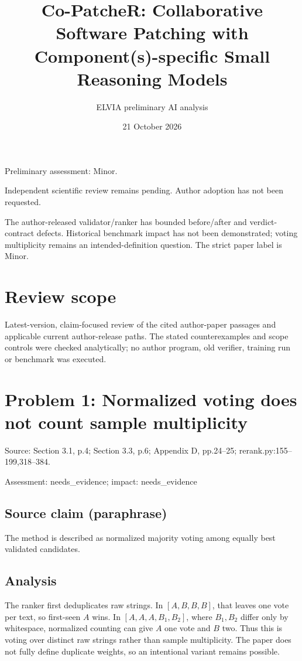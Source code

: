 \documentclass[11pt]{article}
\begin{document}
\title{Co-PatcheR: Collaborative Software Patching with Component(s)-specific Small Reasoning Models}

\author{ELVIA preliminary AI analysis}\date{21 October 2026}\maketitle

Preliminary assessment: Minor.\par

Independent scientific review remains pending. Author adoption has not been requested.

The author-released validator/ranker has bounded before/after and verdict-contract defects. Historical benchmark impact has not been demonstrated; voting multiplicity remains an intended-definition question. The strict paper label is Minor.

\section*{Review scope}

Latest-version, claim-focused review of the cited author-paper passages and applicable current author-release paths. The stated counterexamples and scope controls were checked analytically; no author program, old verifier, training run or benchmark was executed.

\section*{Problem 1: Normalized voting does not count sample multiplicity}

Source: Section 3.1, p.4; Section 3.3, p.6; Appendix D, pp.24–25; rerank.py:155–199,318–384.

Assessment: needs\_evidence; impact: needs\_evidence

\subsection*{Source claim (paraphrase)}

The method is described as normalized majority voting among equally best validated candidates.

\subsection*{Analysis}

The ranker first deduplicates raw strings. In \([A,B,B,B]\), that leaves one vote per text, so first-seen \(A\) wins. In \([A,A,A,B_1,B_2]\), where \(B_1,B_2\) differ only by whitespace, normalized counting can give \(A\) one vote and \(B\) two. Thus this is voting over distinct raw strings rather than sample multiplicity. The paper does not fully define duplicate weights, so an intentional variant remains possible.
\end{document}
